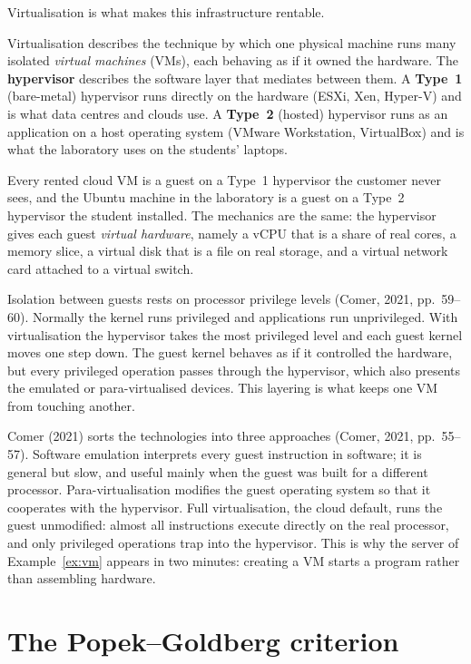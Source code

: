 Virtualisation is what makes this infrastructure rentable.

\begin{definition}\label{def:hypervisor}
Virtualisation describes the technique by which one physical machine runs many
isolated \emph{virtual machines} (VMs), each behaving as if it owned the
hardware. The \textbf{hypervisor} describes the software layer that mediates
between them. A \textbf{Type~1} (bare-metal) hypervisor runs directly on the
hardware (ESXi, Xen, Hyper-V) and is what data centres and clouds use. A
\textbf{Type~2} (hosted) hypervisor runs as an application on a host operating
system (VMware Workstation, VirtualBox) and is what the laboratory uses on the
students' laptops.
\end{definition}

Every rented cloud VM is a guest on a Type~1 hypervisor the customer never
sees, and the Ubuntu machine in the laboratory is a guest on a Type~2
hypervisor the student installed. The mechanics are the same: the hypervisor
gives each guest \emph{virtual hardware}, namely a vCPU that is a share of
real cores, a memory slice, a virtual disk that is a file on real storage,
and a virtual network card attached to a virtual switch.

Isolation between guests rests on processor privilege levels (Comer, 2021,
pp.~59--60). Normally the kernel runs privileged and applications run
unprivileged. With virtualisation the hypervisor takes the most privileged
level and each guest kernel moves one step down. The guest kernel behaves as
if it controlled the hardware, but every privileged operation passes through
the hypervisor, which also presents the emulated or para-virtualised
devices. This layering is what keeps one VM from touching another.

Comer (2021) sorts the technologies into three approaches (Comer, 2021,
pp.~55--57). Software emulation interprets every guest instruction in
software; it is general but slow, and useful mainly when the guest was built
for a different processor. Para-virtualisation modifies the guest operating
system so that it cooperates with the hypervisor. Full virtualisation, the
cloud default, runs the guest unmodified: almost all instructions execute
directly on the real processor, and only privileged operations trap into the
hypervisor. This is why the server of Example~\ref{ex:vm} appears in two
minutes: creating a VM starts a program rather than assembling hardware.

\section{The Popek--Goldberg criterion}


